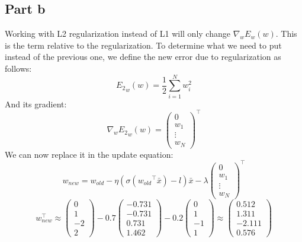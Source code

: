 \documentclass[a4paper, 10pt]{article}
\begin{document}
\subsection{Part b}
Working with L2 regularization instead of L1 will only change $\nabla_wE_w(w)$. This 
is the term relative to the regularization. To determine what we need to put instead of the previous one,
we define the new error due to regularization as follows:
$$
{E_2}_w(w) = \frac{1}{2}\sum_{i=1}^N w_i^2
$$
And its gradient:
$$
\nabla_w{E_2}_w(w) = \left(\begin{array}{c}
    0 \\
    w_1 \\
    \vdots \\
    w_N
\end{array}\right)^\top
$$
We can now replace it in the update equation:
$$
w_{new} = w_{old} - \eta (\sigma({w_{old}}^\top \bar{x}) - l) \bar{x} - \lambda \left(\begin{array}{c}
                                                                                    0 \\
                                                                                    w_1 \\
                                                                                    \vdots \\
                                                                                    w_N
                                                                                \end{array}\right)^\top
$$
$$
w_{new}^\top \approx \left(\begin{array}{c}
    0  \\
    1  \\
    -2 \\
    2
\end{array}\right) - 0.7 \left(\begin{array}{c}
    -0.731 \\
    -0.731 \\
    0.731  \\
    1.462
\end{array}\right) - 0.2 \left(\begin{array}{c}
    0  \\
    1  \\
    -1 \\
    1
\end{array}\right) \approx
\left(\begin{array}{c}
    0.512 \\
    1.311 \\
    -2.111 \\
    0.576
\end{array}\right)
$$
\end{document}
